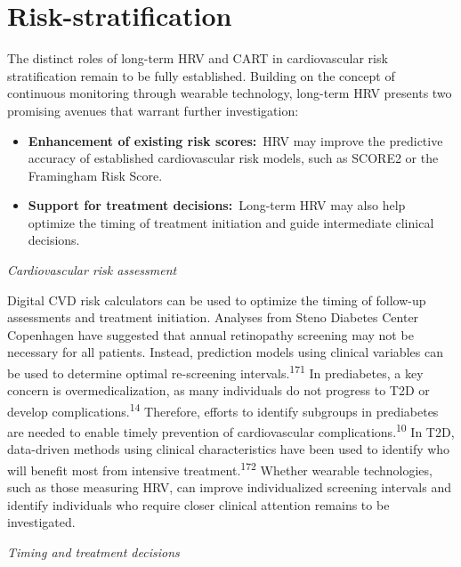 \documentclass[
  letterpaper,
  headsepline=true,
  open=any]{scrbook}
\begin{document}
\hypertarget{risk-stratification-1}{%
\section{Risk-stratification}\label{risk-stratification-1}}

The distinct roles of long-term HRV and CART in cardiovascular risk
stratification remain to be fully established. Building on the concept
of continuous monitoring through wearable technology, long-term HRV
presents two promising avenues that warrant further investigation:

\begin{itemize}
\item
  \textbf{Enhancement of existing risk scores:}~HRV may improve the
  predictive accuracy of established cardiovascular risk models, such as
  SCORE2 or the Framingham Risk Score.
\item
  \textbf{Support for treatment decisions:}~Long-term HRV may also help
  optimize the timing of treatment initiation and guide intermediate
  clinical decisions.
\end{itemize}

\emph{Cardiovascular risk assessment}

Digital CVD risk calculators can be used to optimize the timing of
follow-up assessments and treatment initiation. Analyses from Steno
Diabetes Center Copenhagen have suggested that annual retinopathy
screening may not be necessary for all patients. Instead, prediction
models using clinical variables can be used to determine optimal
re-screening intervals.\textsuperscript{171} In prediabetes, a key
concern is overmedicalization, as many individuals do not progress to
T2D or develop complications.\textsuperscript{14} Therefore, efforts to
identify subgroups in prediabetes are needed to enable timely prevention
of cardiovascular complications.\textsuperscript{10} In T2D, data-driven
methods using clinical characteristics have been used to identify who
will benefit most from intensive treatment.\textsuperscript{172} Whether
wearable technologies, such as those measuring HRV, can improve
individualized screening intervals and identify individuals who require
closer clinical attention remains to be investigated.

\emph{Timing and treatment decisions}
\end{document}
